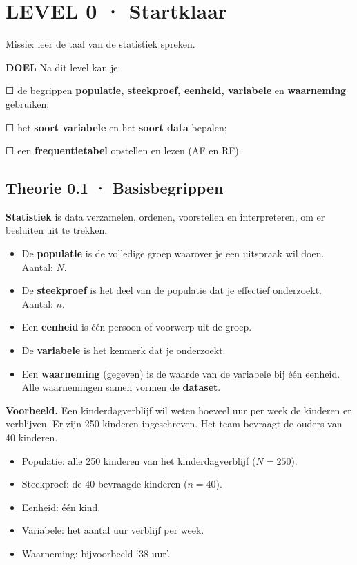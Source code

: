 \section{LEVEL 0 · Startklaar}

\begin{missie}
Missie: leer de taal van de statistiek spreken.
\end{missie}

\begin{doel}
\textbf{DOEL} \quad Na dit level kan je:

☐ de begrippen \textbf{populatie, steekproef, eenheid, variabele} en \textbf{waarneming} gebruiken;

☐ het \textbf{soort variabele} en het \textbf{soort data} bepalen;

☐ een \textbf{frequentietabel} opstellen en lezen (AF en RF).
\end{doel}

\subsection*{Theorie 0.1 · Basisbegrippen}

\begin{theorie}
\textbf{Statistiek} is data verzamelen, ordenen, voorstellen en interpreteren, om er besluiten uit te trekken.

\begin{itemize}
\item De \textbf{populatie} is de volledige groep waarover je een uitspraak wil doen. Aantal: $N$.
\item De \textbf{steekproef} is het deel van de populatie dat je effectief onderzoekt. Aantal: $n$.
\item Een \textbf{eenheid} is één persoon of voorwerp uit de groep.
\item De \textbf{variabele} is het kenmerk dat je onderzoekt.
\item Een \textbf{waarneming} (gegeven) is de waarde van de variabele bij één eenheid. Alle waarnemingen samen vormen de \textbf{dataset}.
\end{itemize}
\end{theorie}

\begin{voorbeeld}
\textbf{Voorbeeld.} Een kinderdagverblijf wil weten hoeveel uur per week de kinderen er verblijven. Er zijn 250 kinderen ingeschreven. Het team bevraagt de ouders van 40 kinderen.

\begin{itemize}
\item Populatie: alle 250 kinderen van het kinderdagverblijf ($N = 250$).
\item Steekproef: de 40 bevraagde kinderen ($n = 40$).
\item Eenheid: één kind.
\item Variabele: het aantal uur verblijf per week.
\item Waarneming: bijvoorbeeld ‘38 uur’.
\end{itemize}
\end{voorbeeld}

